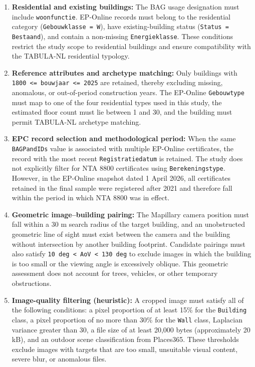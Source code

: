 \begin{enumerate}
\item \textbf{Residential and existing buildings:} The BAG usage designation must include \texttt{woonfunctie}. EP-Online records must belong to the residential category (\texttt{Gebouwklasse = W}), have existing-building status (\texttt{Status = Bestaand}), and contain a non-missing \texttt{Energieklasse}. These conditions restrict the study scope to residential buildings and ensure compatibility with the TABULA-NL residential typology.
\item \textbf{Reference attributes and archetype matching:} Only buildings with \texttt{1800 <= bouwjaar <= 2025} are retained, thereby excluding missing, anomalous, or out-of-period construction years. The EP-Online \texttt{Gebouwtype} must map to one of the four residential types used in this study, the estimated floor count must lie between 1 and 30, and the building must permit TABULA-NL archetype matching.
\item \textbf{EPC record selection and methodological period:} When the same \texttt{BAGPandIDs} value is associated with multiple EP-Online certificates, the record with the most recent \texttt{Registratiedatum} is retained. The study does not explicitly filter for NTA 8800 certificates using \texttt{Berekeningstype}. However, in the EP-Online snapshot dated 1 April 2026, all certificates retained in the final sample were registered after 2021 and therefore fall within the period in which NTA 8800 was in effect.
\item \textbf{Geometric image--building pairing:} The Mapillary camera position must fall within a 30 m search radius of the target building, and an unobstructed geometric line of sight must exist between the camera and the building without intersection by another building footprint. Candidate pairings must also satisfy \texttt{10 deg < AoV < 130 deg} to exclude images in which the building is too small or the viewing angle is excessively oblique. This geometric assessment does not account for trees, vehicles, or other temporary obstructions.
\item \textbf{Image-quality filtering (heuristic):} A cropped image must satisfy all of the following conditions: a pixel proportion of at least 15\% for the \texttt{Building} class, a pixel proportion of no more than 30\% for the \texttt{Wall} class, Laplacian variance greater than 30, a file size of at least 20,000 bytes (approximately 20 kB), and an outdoor scene classification from Places365. These thresholds exclude images with targets that are too small, unsuitable visual content, severe blur, or anomalous files.

\end{enumerate}
